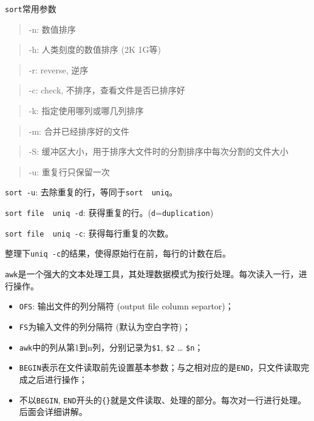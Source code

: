 \documentclass[]{article}
\providecommand{\tightlist}{%
  \setlength{\itemsep}{0pt}\setlength{\parskip}{0pt}}
\numberwithin{figure}{section}
\numberwithin{table}{section}
\begin{document}
\texttt{sort}常用参数

\begin{quote}
-n: 数值排序
\end{quote}

\begin{quote}
-h: 人类刻度的数值排序 (2K 1G等)
\end{quote}

\begin{quote}
-r: reverse, 逆序
\end{quote}

\begin{quote}
-c: check, 不排序，查看文件是否已排序好
\end{quote}

\begin{quote}
-k: 指定使用哪列或哪几列排序
\end{quote}

\begin{quote}
-m: 合并已经排序好的文件
\end{quote}

\begin{quote}
-S: 缓冲区大小，用于排序大文件时的分割排序中每次分割的文件大小
\end{quote}

\begin{quote}
-u: 重复行只保留一次
\end{quote}

\texttt{sort\ -u}: 去除重复的行，等同于\texttt{sort\ \textbar{}\ uniq}。

\texttt{sort\ file\ \textbar{}\ uniq\ -d}: 获得重复的行。(\texttt{d}=\texttt{duplication})

\texttt{sort\ file\ \textbar{}\ uniq\ -c}: 获得每行重复的次数。

整理下\texttt{uniq\ -c}的结果，使得原始行在前，每行的计数在后。

\texttt{awk}是一个强大的文本处理工具，其处理数据模式为按行处理。每次读入一行，进行操作。

\begin{itemize}
\tightlist
\item
  \texttt{OFS}: 输出文件的列分隔符 (output file column separtor)；
\item
  \texttt{FS}为输入文件的列分隔符 (默认为空白字符)；
\item
  \texttt{awk}中的列从第1到n列，分别记录为\texttt{\$1}, \texttt{\$2} \ldots{} \texttt{\$n}；
\item
  \texttt{BEGIN}表示在文件读取前先设置基本参数；与之相对应的是\texttt{END}，只文件读取完成之后进行操作；
\item
  不以\texttt{BEGIN}, \texttt{END}开头的\texttt{\{\}}就是文件读取、处理的部分。每次对一行进行处理。后面会详细讲解。
\end{itemize}
\end{document}
